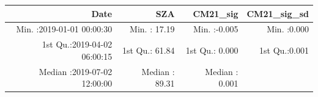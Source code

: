 \documentclass[
  10pt,
  a4paper,oneside]{article}
\begin{document}
\begin{longtable}[]{@{}rrrr@{}}
\toprule
\begin{minipage}[b]{0.33\columnwidth}\raggedleft
Date\strut
\end{minipage} & \begin{minipage}[b]{0.19\columnwidth}\raggedleft
SZA\strut
\end{minipage} & \begin{minipage}[b]{0.19\columnwidth}\raggedleft
CM21\_sig\strut
\end{minipage} & \begin{minipage}[b]{0.19\columnwidth}\raggedleft
CM21\_sig\_sd\strut
\end{minipage}\tabularnewline
\midrule
\endhead
\begin{minipage}[t]{0.33\columnwidth}\raggedleft
Min. :2019-01-01 00:00:30\strut
\end{minipage} & \begin{minipage}[t]{0.19\columnwidth}\raggedleft
Min. : 17.19\strut
\end{minipage} & \begin{minipage}[t]{0.19\columnwidth}\raggedleft
Min. :-0.005\strut
\end{minipage} & \begin{minipage}[t]{0.19\columnwidth}\raggedleft
Min. :0.000\strut
\end{minipage}\tabularnewline
\begin{minipage}[t]{0.33\columnwidth}\raggedleft
1st Qu.:2019-04-02 06:00:15\strut
\end{minipage} & \begin{minipage}[t]{0.19\columnwidth}\raggedleft
1st Qu.: 61.84\strut
\end{minipage} & \begin{minipage}[t]{0.19\columnwidth}\raggedleft
1st Qu.: 0.000\strut
\end{minipage} & \begin{minipage}[t]{0.19\columnwidth}\raggedleft
1st Qu.:0.001\strut
\end{minipage}\tabularnewline
\begin{minipage}[t]{0.33\columnwidth}\raggedleft
Median :2019-07-02 12:00:00\strut
\end{minipage} & \begin{minipage}[t]{0.19\columnwidth}\raggedleft
Median : 89.31\strut
\end{minipage} & \begin{minipage}[t]{0.19\columnwidth}\raggedleft
Median : 0.001\strut
\end{minipage} & \begin{minipage}[t]{0.19\columnwidth}\raggedleft

\end{minipage}
\end{longtable}
\end{document}
